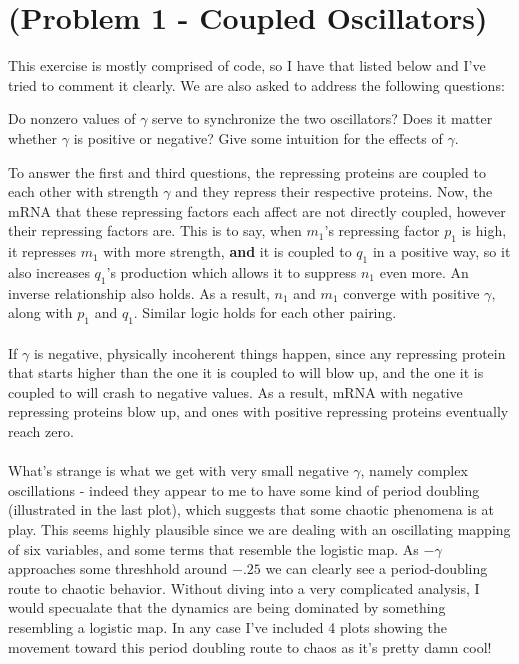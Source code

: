 \documentclass{article}
\begin{document}
\section*{\textbf{(Problem 1 - Coupled Oscillators)}}
This exercise is mostly comprised of code, so I have that listed below and I've tried to comment it clearly. We are also asked to address the following questions:
\begin{tcolorbox}[minipage,colback=gray!30!white,title = \large{\textbf{(i)}}, arc=0pt,outer arc=0pt]
Do nonzero values of $\gamma$ serve to synchronize the two oscillators? Does it matter whether $\gamma$ is positive or negative? Give some intuition for the effects of $\gamma$.
\end{tcolorbox}
To answer the first and third questions, the repressing proteins are coupled to each other with strength $\gamma$ and they repress their respective proteins. Now, the mRNA that these repressing factors each affect are not directly coupled, however their repressing factors are. This is to say, when $m_1$'s repressing factor $p_1$ is high, it represses $m_1$ with more strength, \textbf{and} it is coupled to $q_1$ in a positive way, so it also increases $q_1$'s production which allows it to suppress $n_1$ even more. An inverse relationship also holds. As a result, $n_1$ and $m_1$ converge with positive $\gamma$, along with $p_1$ and $q_1$. Similar logic holds for each other pairing.\\
\\
If $\gamma$ is negative, physically incoherent things happen, since any repressing protein that starts higher than the one it is coupled to will blow up, and the one it is coupled to will crash to negative values. As a result, mRNA with negative repressing proteins blow up, and ones with positive repressing proteins eventually reach zero.\\
\\
What's strange is what we get with very small negative $\gamma$, namely complex oscillations - indeed they appear to me to have some kind of period doubling (illustrated in the last plot), which suggests that some chaotic phenomena is at play. This seems highly plausible since we are dealing with an oscillating mapping of six variables, and some terms that resemble the logistic map. As $-\gamma$ approaches some threshhold around $-.25$ we can clearly see a period-doubling route to chaotic behavior. Without diving into a very complicated analysis, I would specualate that the dynamics are being dominated by something resembling a logistic map. In any case I've included 4 plots showing the movement toward this period doubling route to chaos as it's pretty damn cool!\\
\end{document}
